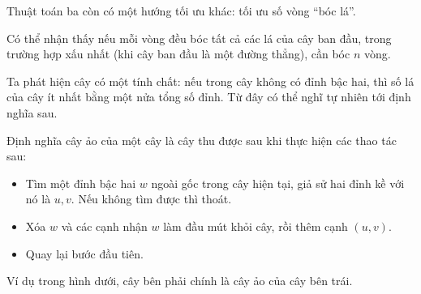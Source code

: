 \documentclass[11pt]{article}
\begin{document}
Thuật toán ba còn có một hướng tối ưu khác: tối ưu số vòng ``bóc lá''.

Có thể nhận thấy nếu mỗi vòng đều bóc tất cả các lá của cây ban đầu, trong
trường hợp xấu nhất (khi cây ban đầu là một đường thẳng), cần bóc \(n\) vòng.

Ta phát hiện cây có một tính chất: nếu trong cây không có đỉnh bậc hai, thì số
lá của cây ít nhất bằng một nửa tổng số đỉnh. Từ đây có thể nghĩ tự nhiên tới
định nghĩa sau.

Định nghĩa cây ảo của một cây là cây thu được sau khi thực hiện các thao tác
sau:

\begin{itemize}
  \item Tìm một đỉnh bậc hai \(w\) ngoài gốc trong cây hiện tại, giả sử hai
  đỉnh kề với nó là \(u,v\). Nếu không tìm được thì thoát.
  \item Xóa \(w\) và các cạnh nhận \(w\) làm đầu mút khỏi cây, rồi thêm cạnh
  \((u,v)\).
  \item Quay lại bước đầu tiên.
\end{itemize}

Ví dụ trong hình dưới, cây bên phải chính là cây ảo của cây bên trái.

\begin{center}
\end{center}
\end{document}
